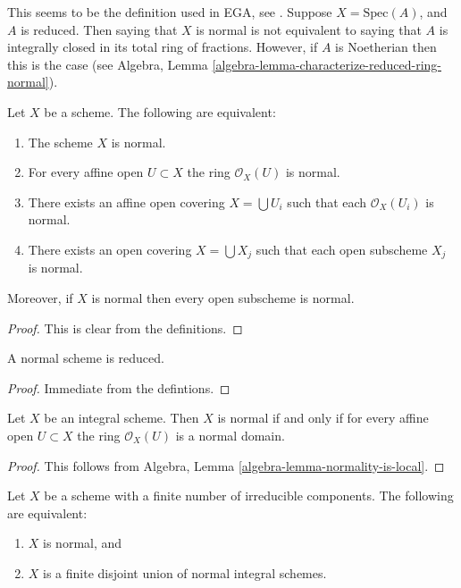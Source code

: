 \noindent
This seems to be the definition used in EGA, see \cite[0, 4.1.4]{EGA}.
Suppose $X = \text{Spec}(A)$, and $A$ is reduced. Then saying that $X$ is
normal is not equivalent to saying that $A$ is integrally closed in its
total ring of fractions. However, if $A$ is Noetherian then this is the case
(see Algebra, Lemma \ref{algebra-lemma-characterize-reduced-ring-normal}).

\begin{lemma}
\label{lemma-locally-normal}
Let $X$ be a scheme. The following are equivalent:
\begin{enumerate}
\item The scheme $X$ is normal.
\item For every affine open $U \subset X$ the ring $\mathcal{O}_X(U)$
is normal.
\item There exists an affine open covering $X = \bigcup U_i$ such that
each $\mathcal{O}_X(U_i)$ is normal.
\item There exists an open covering $X = \bigcup X_j$
such that each open subscheme $X_j$ is normal.
\end{enumerate}
Moreover, if $X$ is normal then every open subscheme
is normal.
\end{lemma}

\begin{proof}
This is clear from the definitions.
\end{proof}

\begin{lemma}
\label{lemma-normal-reduced}
A normal scheme is reduced.
\end{lemma}

\begin{proof}
Immediate from the defintions.
\end{proof}

\begin{lemma}
\label{lemma-integral-normal}
Let $X$ be an integral scheme.
Then $X$ is normal if and only if for every affine open
$U \subset X$ the ring $\mathcal{O}_X(U)$ is a normal domain.
\end{lemma}

\begin{proof}
This follows from
Algebra, Lemma \ref{algebra-lemma-normality-is-local}.
\end{proof}

\begin{lemma}
\label{lemma-normal-locally-finite-nr-irreducibles}
Let $X$ be a scheme with a finite number of irreducible components.
The following are equivalent:
\begin{enumerate}
\item $X$ is normal, and
\item $X$ is a finite disjoint union of normal integral schemes.
\end{enumerate}
\end{lemma}

